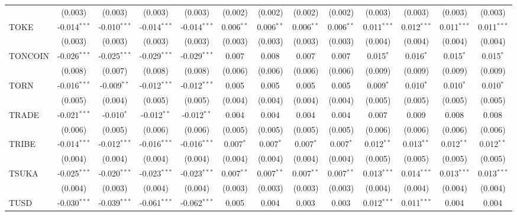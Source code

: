 \begin{table}[!htbp]
\begin{tabular}{@{\extracolsep{5pt}}lcccccccccccc}
  & (0.003) & (0.003) & (0.003) & (0.003) & (0.002) & (0.002) & (0.002) & (0.002) & (0.003) & (0.003) & (0.003) & (0.003) \\
 TOKE & -0.014$^{***}$ & -0.010$^{***}$ & -0.014$^{***}$ & -0.014$^{***}$ & 0.006$^{**}$ & 0.006$^{**}$ & 0.006$^{**}$ & 0.006$^{**}$ & 0.011$^{***}$ & 0.012$^{***}$ & 0.011$^{***}$ & 0.011$^{***}$ \\
  & (0.003) & (0.003) & (0.003) & (0.003) & (0.003) & (0.003) & (0.003) & (0.003) & (0.004) & (0.004) & (0.004) & (0.004) \\
 TONCOIN & -0.026$^{***}$ & -0.025$^{***}$ & -0.029$^{***}$ & -0.029$^{***}$ & 0.007$^{}$ & 0.008$^{}$ & 0.007$^{}$ & 0.007$^{}$ & 0.015$^{*}$ & 0.016$^{*}$ & 0.015$^{*}$ & 0.015$^{*}$ \\
  & (0.008) & (0.007) & (0.008) & (0.008) & (0.006) & (0.006) & (0.006) & (0.006) & (0.009) & (0.009) & (0.009) & (0.009) \\
 TORN & -0.016$^{***}$ & -0.009$^{**}$ & -0.012$^{***}$ & -0.012$^{***}$ & 0.005$^{}$ & 0.005$^{}$ & 0.005$^{}$ & 0.005$^{}$ & 0.009$^{*}$ & 0.010$^{*}$ & 0.010$^{*}$ & 0.010$^{*}$ \\
  & (0.005) & (0.004) & (0.005) & (0.005) & (0.004) & (0.004) & (0.004) & (0.004) & (0.005) & (0.005) & (0.005) & (0.005) \\
 TRADE & -0.021$^{***}$ & -0.010$^{*}$ & -0.012$^{**}$ & -0.012$^{**}$ & 0.004$^{}$ & 0.004$^{}$ & 0.004$^{}$ & 0.004$^{}$ & 0.007$^{}$ & 0.009$^{}$ & 0.008$^{}$ & 0.008$^{}$ \\
  & (0.006) & (0.005) & (0.006) & (0.006) & (0.005) & (0.005) & (0.005) & (0.005) & (0.006) & (0.006) & (0.006) & (0.006) \\
 TRIBE & -0.014$^{***}$ & -0.012$^{***}$ & -0.016$^{***}$ & -0.016$^{***}$ & 0.007$^{*}$ & 0.007$^{*}$ & 0.007$^{*}$ & 0.007$^{*}$ & 0.012$^{**}$ & 0.013$^{**}$ & 0.012$^{**}$ & 0.012$^{**}$ \\
  & (0.004) & (0.004) & (0.004) & (0.004) & (0.004) & (0.004) & (0.004) & (0.004) & (0.005) & (0.005) & (0.005) & (0.005) \\
 TSUKA & -0.025$^{***}$ & -0.020$^{***}$ & -0.023$^{***}$ & -0.023$^{***}$ & 0.007$^{**}$ & 0.007$^{**}$ & 0.007$^{**}$ & 0.007$^{**}$ & 0.013$^{***}$ & 0.014$^{***}$ & 0.013$^{***}$ & 0.013$^{***}$ \\
  & (0.004) & (0.003) & (0.004) & (0.004) & (0.003) & (0.003) & (0.003) & (0.003) & (0.004) & (0.004) & (0.004) & (0.004) \\
 TUSD & -0.030$^{***}$ & -0.039$^{***}$ & -0.061$^{***}$ & -0.062$^{***}$ & 0.005$^{}$ & 0.004$^{}$ & 0.003$^{}$ & 0.003$^{}$ & 0.012$^{***}$ & 0.011$^{***}$ & 0.004$^{}$ & 0.004$^{}$ \\

\end{tabular}
\end{table}

